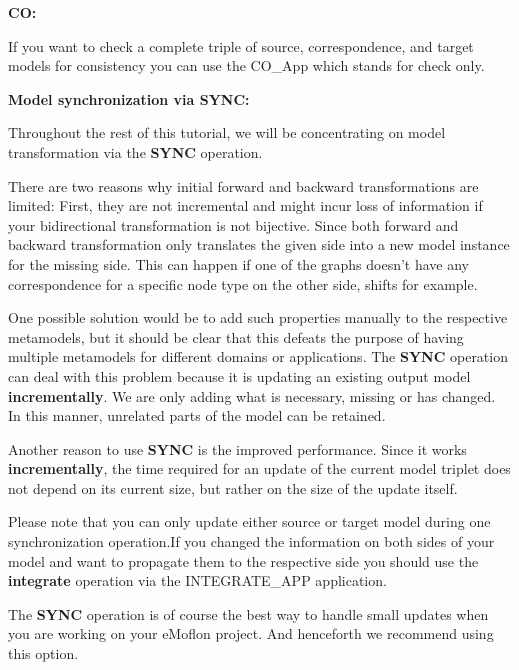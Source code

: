 {\textbf{CO:}

If you want to check a complete triple of source, correspondence, and target models for consistency you can use the \textsf{CO\_App} which stands for check only. \newline

\textbf{Model synchronization via SYNC:}

Throughout the rest of this tutorial, we will be concentrating on model transformation via the \textbf{SYNC} operation. 

There are two reasons why initial forward and backward transformations are limited: First, they are not incremental and might incur loss of information if your bidirectional transformation is not bijective. Since both forward and backward transformation only translates the given side into a new model instance for the missing side. This can happen if one of the graphs doesn't have any correspondence for a specific node type on the other side, shifts for example.\newline

One possible solution would be to add such properties manually to the respective metamodels, but it should be clear that this defeats the purpose of having multiple metamodels for different domains or applications. The \textbf{SYNC} operation can deal with this problem because it is updating an existing output model \textbf{incrementally}. We are only adding what is necessary, missing or has changed. In this manner, unrelated parts of the model can be retained.\newline

Another reason to use \textbf{SYNC} is the improved performance. Since it works \textbf{incrementally}, the time required for an update of the current model triplet does not depend on its current size, but rather on the size of the update itself. 

Please note that you can only update either source or target model during one synchronization operation.If you changed the information on both sides of your model and want to propagate them to the respective side you should use the \textbf{integrate} operation via the \textsf{INTEGRATE\_APP} application. 

The \textbf{SYNC} operation is of course the best way to handle small updates when you are working on your eMoflon project. And henceforth we recommend using this option.\newline

\clearpage

}
